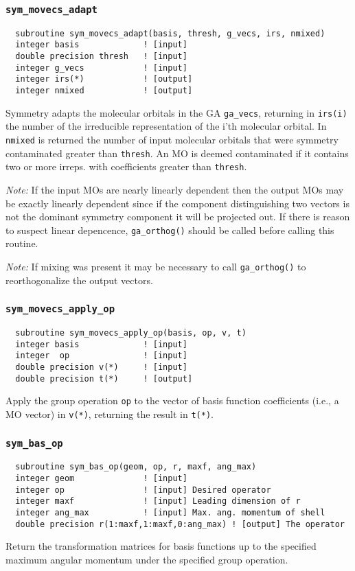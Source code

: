 \subsubsection{{\tt sym\_movecs\_adapt}}
\begin{verbatim}
  subroutine sym_movecs_adapt(basis, thresh, g_vecs, irs, nmixed)
  integer basis             ! [input]
  double precision thresh   ! [input]
  integer g_vecs            ! [input]
  integer irs(*)            ! [output]
  integer nmixed            ! [output]
\end{verbatim}
Symmetry adapts the molecular orbitals in the GA \verb+ga_vecs+,
returning in \verb+irs(i)+ the number of the irreducible
representation of the i'th molecular orbital.  In \verb+nmixed+ is
returned the number of input molecular orbitals that were symmetry
contaminated greater than \verb+thresh+.  An MO is deemed contaminated
if it contains two or more irreps. with coefficients greater than
\verb+thresh+.

{\em Note:} If the input MOs are nearly linearly dependent then the
output MOs may be exactly linearly dependent since if the component
distinguishing two vectors is not the dominant symmetry component it
will be projected out.  If there is reason to suspect linear depencence,
\verb+ga_orthog()+ should be called  before
calling this routine.

{\em Note:} If mixing was present it may be necessary to call
\verb+ga_orthog()+ to reorthogonalize the output vectors.

\subsubsection{{\tt sym\_movecs\_apply\_op}}
\begin{verbatim}
  subroutine sym_movecs_apply_op(basis, op, v, t)
  integer basis             ! [input]
  integer  op               ! [input]
  double precision v(*)     ! [input]
  double precision t(*)     ! [output]
\end{verbatim}
Apply the group operation \verb+op+ to the vector of basis function
coefficients (i.e., a MO vector) in \verb+v(*)+, returning the result
in \verb+t(*)+.

\subsubsection{{\tt sym\_bas\_op}}
\begin{verbatim}
  subroutine sym_bas_op(geom, op, r, maxf, ang_max)
  integer geom              ! [input]
  integer op                ! [input] Desired operator
  integer maxf              ! [input] Leading dimension of r
  integer ang_max           ! [input] Max. ang. momentum of shell
  double precision r(1:maxf,1:maxf,0:ang_max) ! [output] The operator
\end{verbatim}
Return the transformation matrices for basis functions up to the
specified maximum angular momentum under the specified group
operation.

